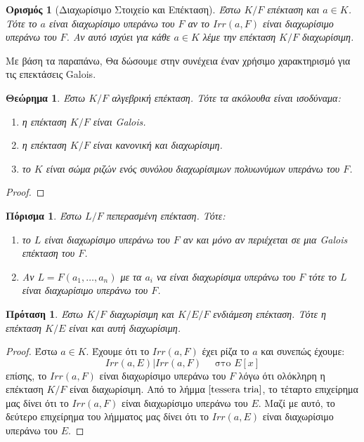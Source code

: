 \documentclass[oneside,a4paper]{article}
\newtheorem{theorem}{Θεώρημα}
\newtheorem*{defn}{Ορισμός}
\newtheorem{prop}{Πρόταση}
\newtheorem{cor}{Πόρισμα}
\newcommand {\tl}{\textlatin}
\begin{document}
\begin{defn}[Διαχωρίσιμο Στοιχείο και Επέκταση]
	Έστω $K/F$ επέκταση και $a \in K$. Τότε το $a$ είναι διαχωρίσιμο υπεράνω του $F$ αν το $Irr(a,F)$ είναι διαχωρίσιμο υπεράνω του $F$. Αν αυτό ισχύει για κάθε $a \in K$ λέμε την επέκταση $K/F$ διαχωρίσιμη.
\end{defn}

\noindent Με βάση τα παραπάνω, Θα δώσουμε στην συνέχεια έναν χρήσιμο χαρακτηρισμό για τις επεκτάσεις \tl{Galois}.

\begin{theorem}
	Έστω $K/F$ αλγεβρική επέκταση. Τότε τα ακόλουθα είναι ισοδύναμα:
	\begin{enumerate}
		\item η επέκταση $K/F$ είναι \tl{Galois}.
		\item η επέκταση $K/F$ είναι κανονική και διαχωρίσιμη.
		\item το $K$ είναι σώμα ριζών ενός συνόλου διαχωρίσιμων πολυωνύμων υπεράνω του $F$.
	\end{enumerate}
\end{theorem}
\begin{proof}
\end{proof}

\begin{cor} Έστω $L/F$ πεπερασμένη επέκταση. Τότε:
	\begin{enumerate}
		\item το $L$ είναι διαχωρίσιμο υπεράνω του $F$ αν και μόνο αν περιέχεται σε μια \tl{Galois} επέκταση του $F$.
		\item Αν $L = F(a_1, \ldots , a_n)$ με τα $a_i$ να είναι διαχωρίσιμα υπεράνω του $F$ τότε το $L$ είναι διαχωρίσιμο υπεράνω του $F$.
	\end{enumerate}
\end{cor}

\begin{prop}
	\label{myprop}
	Έστω $K/F$ διαχωρίσιμη και $K/E/F$ ενδιάμεση επέκταση. Τότε η επέκταση $K/E$ είναι και αυτή διαχωρίσιμη.
\end{prop}
\begin{proof}
	Έστω $a \in K$. Έχουμε ότι το $Irr(a,F)$ έχει ρίζα το $a$ και συνεπώς έχουμε:
	$$Irr(a,E) | Irr(a,F) \quad \text{ στο } E[x]$$
	επίσης, το $Irr(a,F)$ είναι διαχωρίσιμο υπεράνω του $F$ λόγω ότι ολόκληρη η επέκταση $K/F$ είναι διαχωρίσιμη. Από το λήμμα $\ref{tessera tria}$, το τέταρτο επιχείρημα μας δίνει ότι το $Irr(a,F)$ είναι διαχωρίσιμο υπεράνω του $E$. Μαζί με αυτό, το δεύτερο επιχείρημα του λήμματος μας δίνει ότι το $Irr(a,E)$ είναι διαχωρίσιμο υπεράνω του $E$.
\end{proof}
\end{document}
